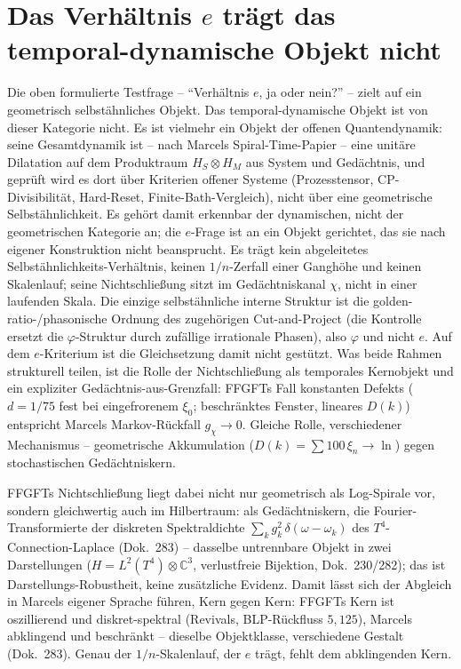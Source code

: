 \section{Das Verhältnis $e$ trägt das temporal-dynamische Objekt nicht}
Die oben formulierte Testfrage -- \enquote{Verhältnis $e$, ja oder nein?} -- zielt auf ein
geometrisch selbstähnliches Objekt. Das temporal-dynamische Objekt ist von dieser Kategorie nicht.
Es ist vielmehr ein Objekt der offenen Quantendynamik: seine Gesamtdynamik ist -- nach Marcels
Spiral-Time-Papier -- eine unitäre Dilatation auf dem Produktraum $H_S\otimes H_M$ aus System und
Gedächtnis, und geprüft wird es dort über Kriterien offener Systeme (Prozesstensor,
CP-Divisibilität, Hard-Reset, Finite-Bath-Vergleich), nicht über eine geometrische
Selbstähnlichkeit. Es gehört damit erkennbar der dynamischen, nicht der geometrischen Kategorie an;
die $e$-Frage ist an ein Objekt gerichtet, das sie nach eigener Konstruktion nicht beansprucht.
Es trägt kein abgeleitetes Selbstähnlichkeits-Verhältnis, keinen $1/n$-Zerfall einer Ganghöhe und
keinen Skalenlauf; seine Nichtschließung sitzt im Gedächtniskanal $\chi$, nicht in einer laufenden
Skala. Die einzige selbstähnliche interne Struktur ist die golden-ratio-/phasonische Ordnung des
zugehörigen Cut-and-Project (die Kontrolle ersetzt die $\varphi$-Struktur durch zufällige
irrationale Phasen), also $\varphi$ und nicht $e$. Auf dem $e$-Kriterium ist die Gleichsetzung
damit nicht gestützt. Was beide Rahmen strukturell teilen, ist die Rolle der Nichtschließung als
temporales Kernobjekt und ein expliziter Gedächtnis-aus-Grenzfall: FFGFTs Fall konstanten
Defekts ($d=1/75$ fest bei eingefrorenem $\xi_0$; beschränktes Fenster, lineares $D(k)$)
entspricht Marcels Markov-Rückfall $g_\chi\to0$. Gleiche Rolle, verschiedener
Mechanismus -- geometrische Akkumulation ($D(k)=\sum 100\,\xi_n\to\ln$) gegen stochastischen
Gedächtniskern.

FFGFTs Nichtschließung liegt dabei nicht nur geometrisch als Log-Spirale vor, sondern gleichwertig
auch im Hilbertraum: als Gedächtniskern, die Fourier-Transformierte der diskreten Spektraldichte
$\sum_k g_k^2\,\delta(\omega-\omega_k)$ des $T^4$-Connection-Laplace (Dok.~283) -- dasselbe
untrennbare Objekt in zwei Darstellungen ($H=L^2(T^4)\otimes\mathbb{C}^3$, verlustfreie Bijektion,
Dok.~230/282); das ist Darstellungs-Robustheit, keine zusätzliche Evidenz. Damit lässt sich der
Abgleich in Marcels eigener Sprache führen, Kern gegen Kern: FFGFTs Kern ist oszillierend und
diskret-spektral (Revivals, BLP-Rückfluss $5{,}125$), Marcels abklingend und beschränkt --
dieselbe Objektklasse, verschiedene Gestalt (Dok.~283). Genau der $1/n$-Skalenlauf, der $e$ trägt,
fehlt dem abklingenden Kern.

